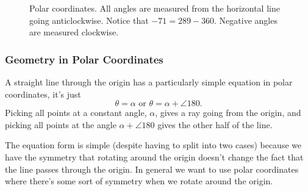 \documentclass[fleqn]{LectureClass/LectureClass}
\begin{document}
    \begin{figure}
        \centering
        \caption[Polar coordinates.]{Polar coordinates. All angles are measured from the horizontal line going anticlockwise. Notice that \(-71 = 289 - 360\). Negative angles are measured clockwise.}
        \label{fig:polar coordinates}
    \end{figure}
    
    \subsubsection{Geometry in Polar Coordinates}
    A straight line through the origin has a particularly simple equation in polar coordinates, it's just
    \begin{equation}
        \theta = \alpha \text{ or } \theta = \alpha + \angle{180}.
    \end{equation}
    Picking all points at a constant angle, \(\alpha\), gives a ray going from the origin, and picking all points at the angle \(\alpha + \angle{180}\) gives the other half of the line.
    
    The equation form is simple (despite having to split into two cases) because we have the symmetry that rotating around the origin doesn't change the fact that the line passes through the origin.
    In general we want to use polar coordinates where there's some sort of symmetry when we rotate around the origin.
    
\end{document}
